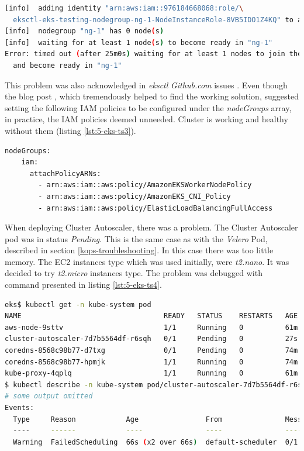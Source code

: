 \begin{lstlisting}[basicstyle=\scriptsize,xleftmargin=0cm,label=lst:5-eks-ts2,caption={Error output from creating \textit{eksctl} cluster},captionpos=b,language=Bash ]
[info]  adding identity "arn:aws:iam::976184668068:role/\
  eksctl-eks-testing-nodegroup-ng-1-NodeInstanceRole-8VB5IDO1Z4KQ" to auth ConfigMap
[info]  nodegroup "ng-1" has 0 node(s)
[info]  waiting for at least 1 node(s) to become ready in "ng-1"
Error: timed out (after 25m0s) waiting for at least 1 nodes to join the cluster\
  and become ready in "ng-1"
\end{lstlisting}
This problem was also acknowledged in \textit{eksctl} \textit{Github.com} issues \cite{eksctl-net-issue2,eksctl-net-issue1}. Even though the blog post \cite{eksctl-net-issue-solution}, which tremendously helped to find the working solution, suggested setting the following IAM policies to be configured under the \textit{nodeGroups} array, in practice, the IAM policies deemed unneeded. Cluster is working and healthy without them (listing \ref{lst:5-eks-ts3}).
\begin{lstlisting}[basicstyle=\scriptsize,xleftmargin=0cm,label=lst:5-eks-ts3,caption={\textit{AWS IAM} policies recommended for \textit{eksctl} by a blog post},captionpos=b,language=Bash ]
nodeGroups:
    iam:
      attachPolicyARNs:
        - arn:aws:iam::aws:policy/AmazonEKSWorkerNodePolicy
        - arn:aws:iam::aws:policy/AmazonEKS_CNI_Policy
        - arn:aws:iam::aws:policy/ElasticLoadBalancingFullAccess
\end{lstlisting}

When deploying Cluster Autoscaler, there was a problem. The Cluster Autoscaler pod was in status \textit{Pending}. This is the same case as with the \textit{Velero} Pod, described in section \ref{kops-troubleshooting}. In this case there was too little memory. The EC2 instances type which was used initially, were \textit{t2.nano}. It was decided to try \textit{t2.micro} instances type. The problem was debugged with command presented in listing \ref{lst:5-eks-ts4}.
\begin{lstlisting}[basicstyle=\scriptsize,xleftmargin=0cm,label=lst:5-eks-ts4,caption={Debugging cluster autoscaler},captionpos=b,language=Bash ]
eks$ kubectl get -n kube-system pod
NAME                                  READY   STATUS    RESTARTS   AGE
aws-node-9sttv                        1/1     Running   0          61m
cluster-autoscaler-7d7b5564df-r6sqh   0/1     Pending   0          27s
coredns-8568c98b77-d7txg              0/1     Pending   0          74m
coredns-8568c98b77-hpmjk              1/1     Running   0          74m
kube-proxy-4qplq                      1/1     Running   0          61m
$ kubectl describe -n kube-system pod/cluster-autoscaler-7d7b5564df-r6sqh
# some output omitted
Events:
  Type     Reason            Age                From               Message
  ----     ------            ----               ----               -------
  Warning  FailedScheduling  66s (x2 over 66s)  default-scheduler  0/1 nodes are available: 1 Insufficient memory.
\end{lstlisting}


